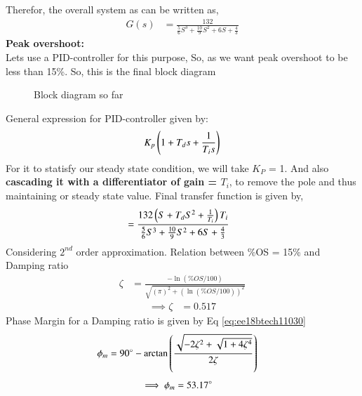\begin{enumerate}[label=\thesection.\arabic*.,ref=\thesection.\theenumi]
Therefor, the overall system as can be written as,\newline
\begin{align}
    G(s) &= \frac{132}{\frac{5}{6}S^3 + \frac{10}{9}S^2 + 6S + \frac{4}{3}}
\end{align}
\textbf{Peak overshoot:}\\
Lets use a PID-controller for this purpose, 
So, as we want peak overshoot to be less than 15\%.\newline
So, this is the final block diagram\newline\newline
\begin{figure}[!ht]
    \begin{center}
			\resizebox{\columnwidth}{!}{}
	\end{center}
\caption{Block diagram so far}
\label{fig:block3}
\end{figure}

General expression for PID-controller given by:
\begin{align}
     K_{p}\left(1 + T_{d}s + \frac{1}{T_{i}s}\right)
\end{align}
For it to statisfy our steady state condition, \newline we will take $K_P$ = 1.\newline
And also \textbf{cascading it with a differentiator of gain = $T_i$}, to remove the pole and thus maintaining or steady state value.\newline
Final transfer function is given by,\newline
\begin{align}
    &= \frac{132\left(S + T_{d}S^2 + \frac{1}{T_{i}}\right)T_i}{\frac{5}{6}S^3 + \frac{10}{9}S^2 + 6S + \frac{4}{3}}
\end{align}
Considering $2^{nd}$ order approximation.\newline
Relation between \%OS = 15\% and Damping ratio
\begin{align}
\zeta &= \frac{-\ln(\%OS/100)}{\sqrt{(\pi)^2 + (\ln(\%OS/100))^2}}
\end{align}
\begin{align}
\implies\zeta &= 0.517 
\end{align}
Phase Margin for a Damping ratio is given by Eq \eqref{eq:ee18btech11030}  
\begin{align}
\label{eq:ee18btech11030}
\phi_{m} &= 90\degree - \arctan\left(\frac{\sqrt{-2\zeta^2+\sqrt{1+4\zeta^4}}}{2\zeta}\right)
\end{align}
\begin{align}
\implies \phi_{m} &= 53.17\degree
\end{align}


\end{enumerate}
